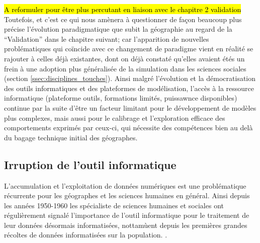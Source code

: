 \hl{A reformuler pour être plus percutant en liaison avec le chapitre 2 validation}
Toutefois, et c'est ce qui nous amènera à questionner de façon beaucoup plus précise l'évolution paradigmatique que subit la géographie au regard de la \enquote{Validation} dans le chapitre suivant; car l'apparition de nouvelles problématiques qui coïncide avec ce changement de paradigme vient en réalité se rajouter à celles déjà existantes, dont on déjà constaté qu'elles avaient étés un frein à une adoption plus généralisée de la simulation dans les sciences sociales (section \ref{ssec:disciplines_touches}). Ainsi malgré l'évolution et la démocratisation des outils informatiques et des plateformes de modélisation, l'accès à la ressource informatique (plateforme outils, formations limités, puissawnce disponibles) continue par la suite d'être un facteur limitant pour le développement de modèles plus complexes, mais aussi pour le calibrage et l'exploration efficace des comportements exprimés par ceux-ci, qui nécessite des compétences bien au delà du bagage technique initial des géographes. 



\subsection{Irruption de l'outil informatique }
\label{sec:apparition_outil_informatique}


L'accumulation et l'exploitation de données numériques est une problématique récurrente pour les géographes et les sciences humaines en général. Ainsi depuis les années 1950-1960 les spécialiste de sciences humaines et sociales ont régulièrement signalé l'importance de l'outil informatique pour le traitement de leur données désormais informatisées, nottamùent depuis les premières grandes récoltes de données informatisées sur la population. \autocite{Kao1963, Hagerstrand1967b} \autocite[386]{Barnes2011}. 

